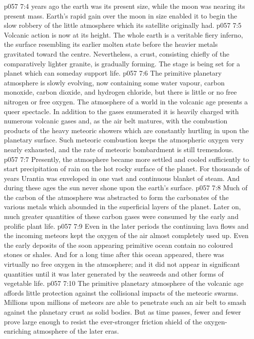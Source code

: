 \vs p057 7:4 \pc {} years ago the earth was  its present size, while the moon was nearing its present mass. Earth’s rapid gain over the moon in size enabled it to begin the slow robbery of the little atmosphere which its satellite originally had.
\vs p057 7:5 Volcanic action is now at its height. The whole earth is a veritable fiery inferno, the surface resembling its earlier molten state before the heavier metals gravitated toward the centre.  Nevertheless, a crust, consisting chiefly of the comparatively lighter granite, is gradually forming. The stage is being set for a planet which can someday support life.
\vs p057 7:6 \pc The primitive planetary atmosphere is slowly evolving, now containing some water vapour, carbon monoxide, carbon dioxide, and hydrogen chloride, but there is little or no free nitrogen or free oxygen. The atmosphere of a world in the volcanic age presents a queer spectacle. In addition to the gases enumerated it is heavily charged with numerous volcanic gases and, as the air belt matures, with the combustion products of the heavy meteoric showers which are constantly hurtling in upon the planetary surface. Such meteoric combustion keeps the atmospheric oxygen very nearly exhausted, and the rate of meteoric bombardment is still tremendous.
\vs p057 7:7 \pc Presently, the atmosphere became more settled and cooled sufficiently to start precipitation of rain on the hot rocky surface of the planet. For thousands of years Urantia was enveloped in one vast and continuous blanket of steam. And during these ages the sun never shone upon the earth’s surface.
\vs p057 7:8 Much of the carbon of the atmosphere was abstracted to form the carbonates of the various metals which abounded in the superficial layers of the planet. Later on, much greater quantities of these carbon gases were consumed by the early and prolific plant life.
\vs p057 7:9 Even in the later periods the continuing lava flows and the incoming meteors kept the oxygen of the air almost completely used up. Even the early deposits of the soon appearing primitive ocean contain no coloured stones or shales. And for a long time after this ocean appeared, there was virtually no free oxygen in the atmosphere; and it did not appear in significant quantities until it was later generated by the seaweeds and other forms of vegetable life.
\vs p057 7:10 The primitive planetary atmosphere of the volcanic age affords little protection against the collisional impacts of the meteoric swarms. Millions upon millions of meteors are able to penetrate such an air belt to smash against the planetary crust as solid bodies. But as time passes, fewer and fewer prove large enough to resist the ever\hyp{}stronger friction shield of the oxygen\hyp{}enriching atmosphere of the later eras.
